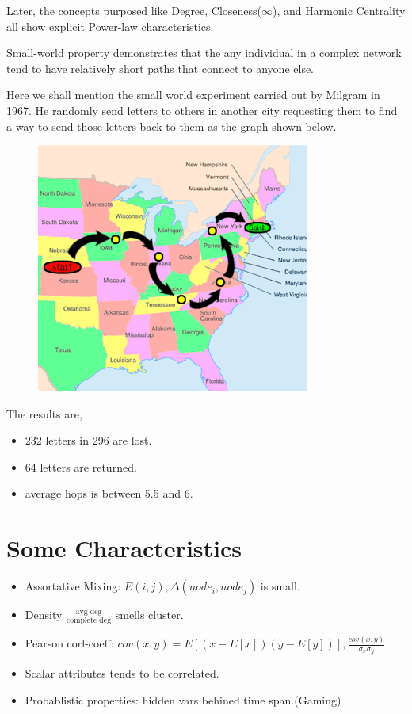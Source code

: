 \documentclass[UTF8, 11pt, a4paper]{ctexart}
\begin{document}
Later, the concepts purposed like Degree, Closeness($\infty$), and Harmonic Centrality all show explicit Power-law characteristics.

Small-world property demonstrates that the any individual in a complex network tend to have relatively short paths that connect to anyone else. 

Here we shall mention the small world experiment carried out by Milgram in 1967. He randomly send letters to others in another city requesting them to find a way to send those letters back to them as the graph shown below.

\begin{figure}[H]
	\centering
	\includegraphics[width=0.80\textwidth]{smallworld}
	\caption{}
\end{figure}

The results are,

\begin{itemize}
\item 232 letters in 296 are lost.
\item 64 letters are returned.
\item average hops is between 5.5 and 6.
\end{itemize}

\section{Some Characteristics}

\begin{itemize}
\item Assortative Mixing: 
$E(i,j), \Delta(node_i,node_j)$ is small.
\item Density $\frac{\text{avg deg}}{\text{complete deg}}$ smells cluster.
\item Pearson corl-coeff:
$cov(x,y)=E[(x-E[x])(y-E[y])], \frac{cov(x,y)}{\sigma_x \sigma_y}$
\item Scalar attributes tends to be correlated.
\item Probablistic properties: 
hidden vars behined time span.(Gaming)
\end{itemize}
\end{document}
